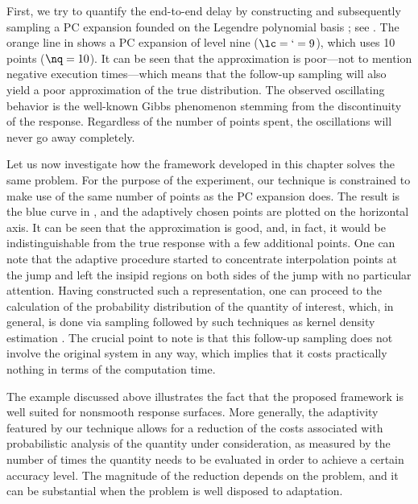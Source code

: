 First, we try to quantify the end-to-end delay by constructing and subsequently
sampling a \ac{PC} expansion founded on the Legendre polynomial basis
\cite{xiu2010}; see . The orange line in
 shows a \ac{PC} expansion of level nine ($\lc = \lq =
9$), which uses 10 points ($\nq = 10$). It can be seen that the approximation is
poor---not to mention negative execution times---which means that the follow-up
sampling will also yield a poor approximation of the true distribution. The
observed oscillating behavior is the well-known Gibbs phenomenon stemming from
the discontinuity of the response. Regardless of the number of points spent, the
oscillations will never go away completely.

Let us now investigate how the framework developed in this chapter solves the
same problem. For the purpose of the experiment, our technique is constrained to
make use of the same number of points as the \ac{PC} expansion does. The result
is the blue curve in , and the adaptively chosen
points are plotted on the horizontal axis. It can be seen that the approximation
is good, and, in fact, it would be indistinguishable from the true response with
a few additional points. One can note that the adaptive procedure started to
concentrate interpolation points at the jump and left the insipid regions on
both sides of the jump with no particular attention. Having constructed such a
representation, one can proceed to the calculation of the probability
distribution of the quantity of interest, which, in general, is done via
sampling followed by such techniques as kernel density estimation
\cite{hastie2013}. The crucial point to note is that this follow-up sampling
does not involve the original system in any way, which implies that it costs
practically nothing in terms of the computation time.

The example discussed above illustrates the fact that the proposed framework is
well suited for nonsmooth response surfaces. More generally, the adaptivity
featured by our technique allows for a reduction of the costs associated with
probabilistic analysis of the quantity under consideration, as measured by the
number of times the quantity needs to be evaluated in order to achieve a certain
accuracy level. The magnitude of the reduction depends on the problem, and it
can be substantial when the problem is well disposed to adaptation.
